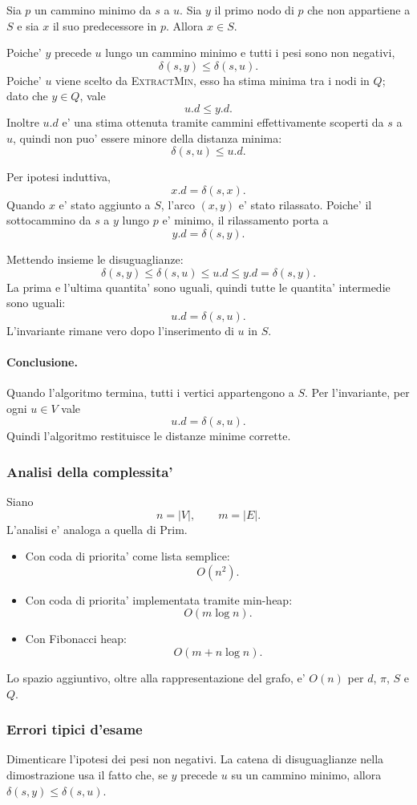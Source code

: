Sia $p$ un cammino minimo da $s$ a $u$. Sia $y$ il primo nodo di $p$ che non appartiene a $S$ e sia $x$ il suo predecessore in $p$. Allora $x\in S$.

Poiche' $y$ precede $u$ lungo un cammino minimo e tutti i pesi sono non negativi,
\[
\delta(s,y)\le \delta(s,u).
\]
Poiche' $u$ viene scelto da \textsc{ExtractMin}, esso ha stima minima tra i nodi in $Q$; dato che $y\in Q$, vale
\[
u.d\le y.d.
\]
Inoltre $u.d$ e' una stima ottenuta tramite cammini effettivamente scoperti da $s$ a $u$, quindi non puo' essere minore della distanza minima:
\[
\delta(s,u)\le u.d.
\]

Per ipotesi induttiva,
\[
x.d=\delta(s,x).
\]
Quando $x$ e' stato aggiunto a $S$, l'arco $(x,y)$ e' stato rilassato. Poiche' il sottocammino da $s$ a $y$ lungo $p$ e' minimo, il rilassamento porta a
\[
y.d=\delta(s,y).
\]

Mettendo insieme le disuguaglianze:
\[
\delta(s,y)\le \delta(s,u)\le u.d\le y.d=\delta(s,y).
\]
La prima e l'ultima quantita' sono uguali, quindi tutte le quantita' intermedie sono uguali:
\[
u.d=\delta(s,u).
\]
L'invariante rimane vero dopo l'inserimento di $u$ in $S$.

\paragraph{Conclusione.}
Quando l'algoritmo termina, tutti i vertici appartengono a $S$. Per l'invariante, per ogni $u\in V$ vale
\[
u.d=\delta(s,u).
\]
Quindi l'algoritmo restituisce le distanze minime corrette.

\subsubsection{Analisi della complessita'}
Siano
\[
n=|V|,\qquad m=|E|.
\]
L'analisi e' analoga a quella di Prim.

\begin{itemize}
	\item Con coda di priorita' come lista semplice:
	\[
	O(n^2).
	\]
	\item Con coda di priorita' implementata tramite min-heap:
	\[
	O(m\log n).
	\]
	\item Con Fibonacci heap:
	\[
	O(m+n\log n).
	\]
\end{itemize}

Lo spazio aggiuntivo, oltre alla rappresentazione del grafo, e' $O(n)$ per $d$, $\pi$, $S$ e $Q$.

\subsubsection{Errori tipici d'esame}
\begin{hardnote}
Dimenticare l'ipotesi dei pesi non negativi. La catena di disuguaglianze nella dimostrazione usa il fatto che, se $y$ precede $u$ su un cammino minimo, allora $\delta(s,y)\le \delta(s,u)$.
\end{hardnote}

